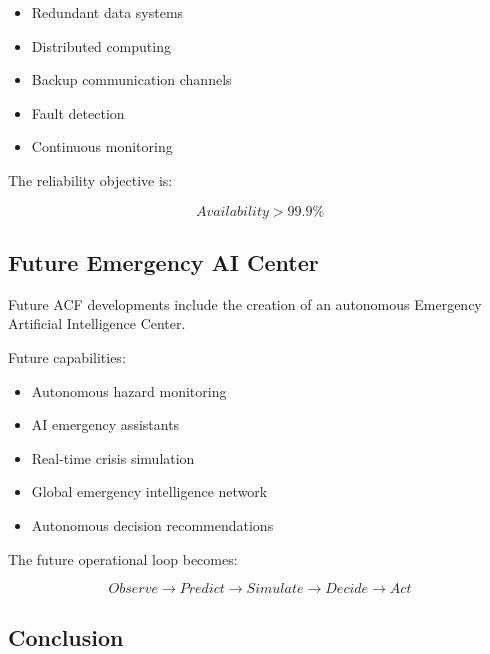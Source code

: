 \begin{itemize}

\item Redundant data systems

\item Distributed computing

\item Backup communication channels

\item Fault detection

\item Continuous monitoring

\end{itemize}


The reliability objective is:

\[
Availability > 99.9\%
\]



\subsection{Future Emergency AI Center}

Future ACF developments include the creation of an autonomous
Emergency Artificial Intelligence Center.

Future capabilities:

\begin{itemize}

\item Autonomous hazard monitoring

\item AI emergency assistants

\item Real-time crisis simulation

\item Global emergency intelligence network

\item Autonomous decision recommendations

\end{itemize}


The future operational loop becomes:

\[
Observe
\rightarrow
Predict
\rightarrow
Simulate
\rightarrow
Decide
\rightarrow
Act
\]



\subsection{Conclusion}

